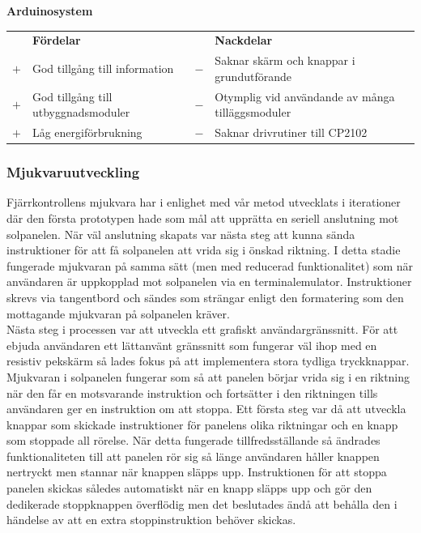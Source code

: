 \documentclass{article}
\begin{document}
            \noindent\textsf{\textbf{Arduinosystem}} \\ 
            \begin{tabularx}{\textwidth}{@{}cXcX} 
                & \textbf{Fördelar}     & & \textbf{Nackdelar} \\
                $+$ & God tillgång till information & 
                                        $-$ & Saknar skärm och knappar i 
                                            grundutförande \\
                $+$ & God tillgång till utbyggnads\-moduler & 
                                        $-$ & Otymplig vid användande av   
                                            många tilläggsmoduler \\
                $+$ & Låg energiförbrukning &
                                        $-$ & Saknar drivrutiner till CP2102 \\

            \end{tabularx}

            \subsubsection{Mjukvaruutveckling} %
            \label{subsub:mjukvaruutveckling}
            Fjärrkontrollens mjukvara har i enlighet med vår metod utvecklats i iterationer där den första prototypen hade som mål att upprätta en seriell anslutning mot solpanelen.
            När väl anslutning skapats var nästa steg att kunna sända instruktioner för att få solpanelen att vrida sig i önskad riktning. I detta stadie fungerade mjukvaran på samma sätt (men med reducerad funktionalitet) som när användaren är uppkopplad mot solpanelen via en terminalemulator. Instruktioner skrevs via tangentbord och sändes som strängar enligt den formatering som den mottagande mjukvaran på solpanelen kräver. \\

            \noindent Nästa steg i processen var att utveckla ett grafiskt användargränssnitt. För att ebjuda användaren ett lättanvänt gränssnitt som fungerar väl ihop med en resistiv pekskärm
            så lades fokus på att implementera stora tydliga tryckknappar. 
            Mjukvaran i solpanelen fungerar som så att panelen börjar vrida sig i en riktning när den får en motsvarande instruktion och fortsätter i den riktningen tills användaren ger en instruktion om att stoppa. Ett första steg var då att utveckla knappar som skickade instruktioner för panelens olika riktningar och en knapp som stoppade all rörelse.
            När detta fungerade tillfredsställande så ändrades funktionaliteten till att panelen rör sig så länge användaren håller knappen nertryckt men stannar när knappen släpps upp.
            Instruktionen för att stoppa panelen skickas således automatiskt när en knapp släpps upp och gör den dedikerade stoppknappen överflödig men det beslutades ändå att behålla den i händelse av att en extra stoppinstruktion behöver skickas. \\
\end{document}
